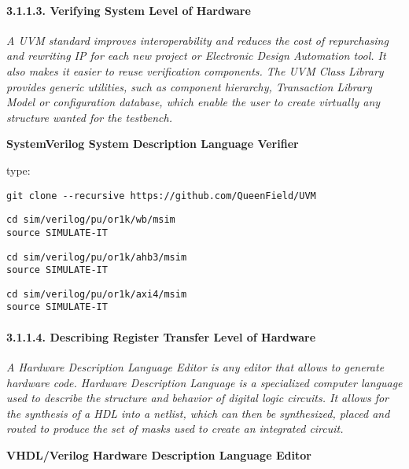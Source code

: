 \documentclass[]{article}
\let\oldparagraph\paragraph
\renewcommand{\paragraph}[1]{\oldparagraph{#1}\mbox{}}
\begin{document}
\paragraph{3.1.1.3. Verifying System Level of
Hardware}\label{verifying-system-level-of-hardware}

\emph{A UVM standard improves interoperability and reduces the cost of
repurchasing and rewriting IP for each new project or Electronic Design
Automation tool. It also makes it easier to reuse verification
components. The UVM Class Library provides generic utilities, such as
component hierarchy, Transaction Library Model or configuration
database, which enable the user to create virtually any structure wanted
for the testbench.}

\textbf{SystemVerilog System Description Language Verifier}

type:

\begin{verbatim}
git clone --recursive https://github.com/QueenField/UVM
\end{verbatim}

\begin{verbatim}
cd sim/verilog/pu/or1k/wb/msim
source SIMULATE-IT
\end{verbatim}

\begin{verbatim}
cd sim/verilog/pu/or1k/ahb3/msim
source SIMULATE-IT
\end{verbatim}

\begin{verbatim}
cd sim/verilog/pu/or1k/axi4/msim
source SIMULATE-IT
\end{verbatim}

\paragraph{3.1.1.4. Describing Register Transfer Level of
Hardware}\label{describing-register-transfer-level-of-hardware}

\emph{A Hardware Description Language Editor is any editor that allows
to generate hardware code. Hardware Description Language is a
specialized computer language used to describe the structure and
behavior of digital logic circuits. It allows for the synthesis of a HDL
into a netlist, which can then be synthesized, placed and routed to
produce the set of masks used to create an integrated circuit.}

\textbf{VHDL/Verilog Hardware Description Language Editor}
\end{document}
